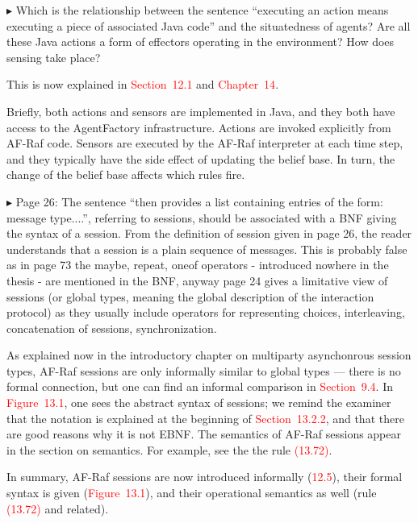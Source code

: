 \documentclass{article}
\newcommand*\R[1]{\textcolor{red}{#1}} %
\newenvironment{them}%
  {\bigskip\noindent\begingroup\color{blue}$\blacktriangleright$\enspace}%
  {\endgroup\par}
\begin{document}
\begin{them}
Which is the relationship between the sentence ``executing an action means
executing a piece of associated Java code'' and the situatedness of agents? Are
all these Java actions a form of effectors operating in the environment? How
does sensing take place?
\end{them}

This is now explained in \R{Section~12.1} and \R{Chapter~14}.

Briefly, both actions and sensors are implemented in Java,
  and they both have access to the AgentFactory infrastructure.
Actions are invoked explicitly from AF-Raf code.
Sensors are executed by the AF-Raf interpreter at each time step,
  and they typically have the side effect of updating the belief base.
In turn, the change of the belief base affects
  which rules fire.


\begin{them}
Page 26:
The sentence ``then provides a list containing entries of the form: message
type....'', referring to sessions, should be associated with a BNF giving the
syntax of a session. From the definition of session given in page 26, the
reader understands that a session is a plain sequence of messages. This is
probably false as in page 73 the maybe, repeat, oneof operators - introduced
nowhere in the thesis - are mentioned in the BNF, anyway page 24 gives a
limitative view of sessions (or global types, meaning the global description of
the interaction protocol) as they usually include operators for representing
choices, interleaving, concatenation of sessions, synchronization. 
\end{them}

As explained now in the introductory chapter on multiparty asynchonrous session
types, AF-Raf sessions are only informally similar to global types --- there is
no formal connection, but one can find an informal comparison in
\R{Section~9.4}. In \R{Figure~13.1}, one sees the abstract syntax of sessions;
we remind the examiner that the notation is explained at the beginning of
\R{Section~13.2.2}, and that there are good reasons why it is not EBNF.  The
semantics of AF-Raf sessions appear in the section on semantics.  For example,
see the the rule \R{(13.72)}.

In summary,
  AF-Raf sessions are now introduced informally (\R{12.5}),
  their formal syntax is given (\R{Figure~13.1}),
  and their operational semantics as well (rule \R{(13.72)} and related).
\end{document}
